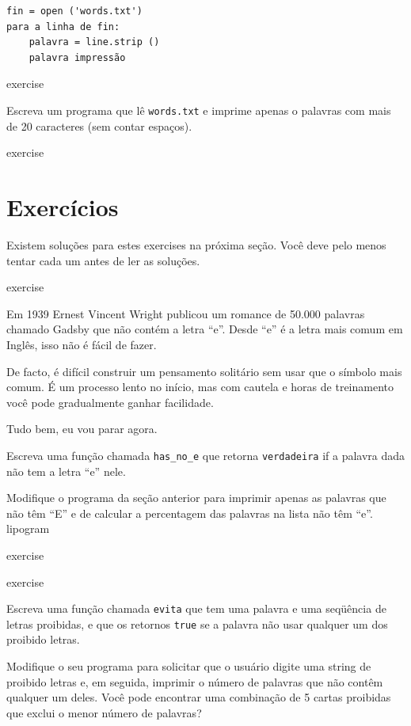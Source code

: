 \documentclass[10pt]{book}
\begin{document}
\begin{exercise}
\begin{verbatim}
fin = open ('words.txt')
para a linha de fin:
    palavra = line.strip ()
    palavra impressão
\end{verbatim}
%

\begin{} exercise

Escreva um programa que lê {\tt words.txt} e imprime apenas o
palavras com mais de 20 caracteres (sem contar espaços).

\end{} exercise


\section{Exercícios}

Existem soluções para estes exercises na próxima seção.
Você deve pelo menos tentar cada um antes de ler as soluções.

\begin{} exercise

Em 1939 Ernest Vincent Wright publicou um romance de 50.000 palavras chamado
{\Em Gadsby} que não contém a letra ``e''. Desde ``e'' é
a letra mais comum em Inglês, isso não é fácil de fazer.

De facto, é difícil construir um pensamento solitário sem usar
que o símbolo mais comum. É um processo lento no início, mas com cautela
e horas de treinamento você pode gradualmente ganhar facilidade.

Tudo bem, eu vou parar agora.

Escreva uma função chamada \verb "has_no_e" que retorna {\tt verdadeira} if
a palavra dada não tem a letra ``e'' nele.

Modifique o programa da seção anterior para imprimir apenas as palavras
que não têm ``E'' e de calcular a percentagem das palavras na lista
não têm ``e''.
\index{} lipogram

\end{} exercise


\begin{} exercise 

Escreva uma função chamada {\tt evita}
que tem uma palavra e uma seqüência de letras proibidas, e
que os retornos {\tt true} se a palavra não usar qualquer um dos proibido
letras.

Modifique o seu programa para solicitar que o usuário digite uma string
de proibido letras e, em seguida, imprimir o número de palavras que
não contêm qualquer um deles.
Você pode encontrar uma combinação de 5 cartas proibidas que
exclui o menor número de palavras?


\end{}
\end{exercise}
\end{document}
